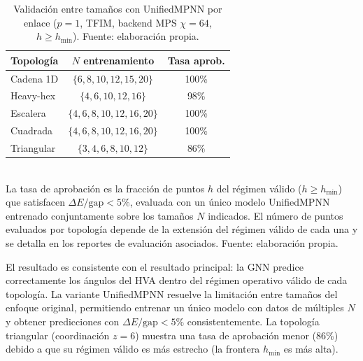 \documentclass[11pt,a4paper,spanish]{book}
\begin{document}
\begin{table}[h]
\centering
\caption[Validación entre tamaños con UnifiedMPNN por enlace]{Validación entre tamaños con UnifiedMPNN por enlace ($p = 1$, TFIM, backend MPS $\chi = 64$, $h \geq h_{\min}$). Fuente: elaboración propia.}
\label{tab:cross_n_transfer}
\begin{tabular}{lcc}
\toprule
\textbf{Topología} & \textbf{$N$ entrenamiento} & \textbf{Tasa aprob.} \\
\midrule
Cadena 1D & $\{6, 8, 10, 12, 15, 20\}$ & 100\% \\
Heavy-hex & $\{4, 6, 10, 12, 16\}$ & 98\% \\
Escalera & $\{4, 6, 8, 10, 12, 16, 20\}$ & 100\% \\
Cuadrada & $\{4, 6, 8, 10, 12, 16, 20\}$ & 100\% \\
Triangular & $\{3, 4, 6, 8, 10, 12\}$ & 86\% \\
\bottomrule
\end{tabular}
\\[2pt]
\footnotesize La tasa de aprobación es la fracción de puntos $h$ del régimen válido ($h \geq h_{\min}$) que satisfacen $\Delta E/\text{gap} < 5\%$, evaluada con un único modelo UnifiedMPNN entrenado conjuntamente sobre los tamaños $N$ indicados. El número de puntos evaluados por topología depende de la extensión del régimen válido de cada una y se detalla en los reportes de evaluación asociados. Fuente: elaboración propia.
\end{table}

El resultado es consistente con el resultado principal: la GNN predice correctamente los ángulos del HVA dentro del régimen operativo válido de cada topología. La variante UnifiedMPNN resuelve la limitación entre tamaños del enfoque original, permitiendo entrenar un único modelo con datos de múltiples $N$ y obtener predicciones con $\Delta E/\text{gap} < 5\%$ consistentemente. La topología triangular (coordinación $z = 6$) muestra una tasa de aprobación menor (86\%) debido a que su régimen válido es más estrecho (la frontera $h_{\min}$ es más alta).
\end{document}
